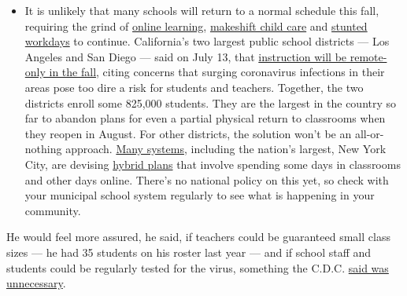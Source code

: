 \begin{itemize}
  \begin{itemize}
  \tightlist
  \item
    It is unlikely that many schools will return to a normal schedule
    this fall, requiring the grind of
    \href{https://www.nytimes.com/2020/06/05/us/coronavirus-education-lost-learning.html?action=click\&pgtype=Article\&state=default\&region=MAIN_CONTENT_3\&context=storylines_faq}{online
    learning},
    \href{https://www.nytimes.com/2020/05/29/us/coronavirus-child-care-centers.html?action=click\&pgtype=Article\&state=default\&region=MAIN_CONTENT_3\&context=storylines_faq}{makeshift
    child care} and
    \href{https://www.nytimes.com/2020/06/03/business/economy/coronavirus-working-women.html?action=click\&pgtype=Article\&state=default\&region=MAIN_CONTENT_3\&context=storylines_faq}{stunted
    workdays} to continue. California's two largest public school
    districts --- Los Angeles and San Diego --- said on July 13, that
    \href{https://www.nytimes.com/2020/07/13/us/lausd-san-diego-school-reopening.html?action=click\&pgtype=Article\&state=default\&region=MAIN_CONTENT_3\&context=storylines_faq}{instruction
    will be remote-only in the fall}, citing concerns that surging
    coronavirus infections in their areas pose too dire a risk for
    students and teachers. Together, the two districts enroll some
    825,000 students. They are the largest in the country so far to
    abandon plans for even a partial physical return to classrooms when
    they reopen in August. For other districts, the solution won't be an
    all-or-nothing approach.
    \href{https://bioethics.jhu.edu/research-and-outreach/projects/eschool-initiative/school-policy-tracker/}{Many
    systems}, including the nation's largest, New York City, are
    devising
    \href{https://www.nytimes.com/2020/06/26/us/coronavirus-schools-reopen-fall.html?action=click\&pgtype=Article\&state=default\&region=MAIN_CONTENT_3\&context=storylines_faq}{hybrid
    plans} that involve spending some days in classrooms and other days
    online. There's no national policy on this yet, so check with your
    municipal school system regularly to see what is happening in your
    community.
  \end{itemize}
\end{itemize}

He would feel more assured, he said, if teachers could be guaranteed
small class sizes --- he had 35 students on his roster last year --- and
if school staff and students could be regularly tested for the virus,
something the C.D.C.
\href{https://www.cdc.gov/coronavirus/2019-ncov/community/schools-childcare/k-12-testing.html}{said
was unnecessary}.

